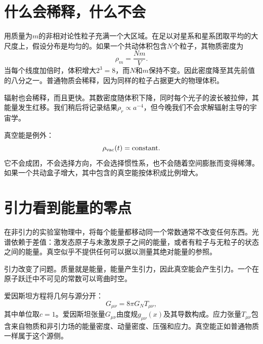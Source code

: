 \begin{classroomqa}
\end{classroomqa}

\section{什么会稀释，什么不会}

用质量为\(m\)的非相对论性粒子充满一个大区域。在足以对星系和星系团取平均的大尺度上，假设分布是均匀的。如果一个共动体积包含\(N\)个粒子，其物质密度为
\begin{equation}
\rho_m=\frac{Nm}{V}.
\end{equation}
当每个线度加倍时，体积增大\(2^3=8\)，而\(N\)和\(m\)保持不变。因此密度降至其先前值的八分之一。普通物质会稀释，因为同样的粒子占据更大的物理体积。

辐射也会稀释，而且更快。其数密度随体积下降，同时每个光子的波长被拉伸，其能量发生红移。我们稍后将记录结果\(\rho_r\propto a^{-4}\)，但今晚我们不会求解辐射主导的宇宙学。

真空能是例外：
\begin{equation}
\rho_{\rm vac}(t)=\text{constant}.
\label{eq:l08-rho-vac-constant}
\end{equation}
它不会成团，不会选择方向，不会选择惯性系，也不会随着空间膨胀而变得稀薄。如果一个共动盒子增大，其中包含的真空能按体积成比例增大。


\section{引力看到能量的零点}

在非引力的实验室物理中，将每个能量都移动同一个常数通常不改变任何东西。光谱依赖于差值：激发态原子与未激发原子之间的能量，或者有粒子与无粒子的状态之间的能量。真空似乎不提供任何可以据以测量其绝对能量的参照。

引力改变了问题。质量就是能量，能量产生引力，因此真空能会产生引力。一个在原子跃迁中不可见的常数可以弯曲时空。

爱因斯坦方程将几何与源分开：
\begin{equation}
G_{\mu\nu}=8\pi G_N T_{\mu\nu},
\label{eq:l08-einstein}
\end{equation}
其中单位取\(c=1\)。爱因斯坦张量\(G_{\mu\nu}\)由度规\(g_{\mu\nu}(x)\)及其导数构成。应力张量\(T_{\mu\nu}\)包含来自物质和非引力场的能量密度、动量密度、压强和应力。真空能正如普通物质一样属于这个源侧。


